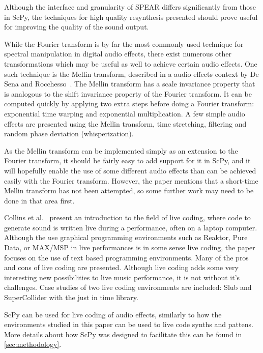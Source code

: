 \documentclass{article}
\begin{document}
Although the interface and granularity of SPEAR differs significantly from those in ScPy, the
techniques for high quality resynthesis presented should prove useful for improving the quality of
the sound output.
\\\par
While the Fourier transform is by far the most commonly used technique for spectral manipulation in
digital audio effects, there exist numerous other transformations which may be useful as well to
achieve certain audio effects. One such technique is the Mellin transform, described in a audio
effects context by De Sena and Rocchesso~\cite{de2004fast}. The Mellin transform has a scale
invariance property that is analogous to the shift invariance property of the Fourier transform. It
can be computed quickly by applying two extra steps before doing a Fourier transform: exponential
time warping and exponential multiplication. A few simple audio effects are presented using the
Mellin transform, time stretching, filtering and random phase deviation (whisperization).

As the Mellin transform can be implemented simply as an extension to the Fourier transform, it
should be fairly easy to add support for it in ScPy, and it will hopefully enable the use of
some different audio effects than can be achieved easily with the Fourier transform. However, the
paper mentions that a short-time Mellin transform has not been attempted, so some further work may
need to be done in that area first.
\\\par
Collins et al.~\cite{collins2003live} present an introduction to the field of live coding, where
code to generate sound is written live during a performance, often on a laptop computer. Although
the use graphical programming environments such as Reaktor, Pure Data, or MAX/MSP in live
performances is in some sense live coding, the paper focuses on the use of text based programming
environments. Many of the pros and cons of live coding are presented. Although live coding adds
some very interesting new possibilities to live music performance, it is not without it's
challenges. Case studies of two live coding environments are included: Slub and SuperCollider with
the just in time library.

ScPy can be used for live coding of audio effects, similarly to how the environments studied in
this paper can be used to live code synths and pattens. More details about how ScPy was designed to
facilitate this can be found in \autoref{sec:methodology}.
\end{document}
